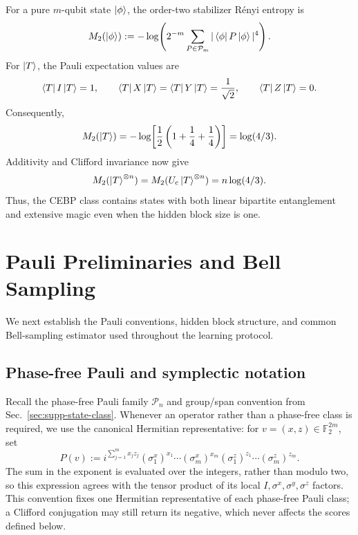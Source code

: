 \documentclass[
  aps,
  prx,
  reprint,
  superscriptaddress,
  amsmath,
  amssymb,
  nofootinbib,
  longbibliography
]{revtex4-2}
\newcommand{\Pc}{\mathcal{P}}
\newcommand{\Fc}{\mathbb{F}_2}
\begin{document}
For a pure $m$-qubit state $\ket{\phi}$, the order-two stabilizer R\'enyi
entropy is~\cite{LeoneOlivieroHamma2022SRE}
\begin{equation}
M_2(\ket{\phi})
:=-\log\!\left(
2^{-m}\sum_{P\in\Pc_m}|\bra{\phi}P\ket{\phi}|^4
\right).
\label{eq:supp-stabilizer-renyi-two}
\end{equation}
For $\ket{T}$, the Pauli expectation values are
\begin{equation}
\bra{T}I\ket{T}=1,
\qquad
\bra{T}X\ket{T}=\bra{T}Y\ket{T}=\frac{1}{\sqrt2},
\qquad
\bra{T}Z\ket{T}=0.
\end{equation}
Consequently,
\begin{equation}
M_2(\ket{T})
=-\log\!\left[\frac{1}{2}\left(1+\frac14+\frac14\right)\right]
=\log(4/3).
\end{equation}
Additivity and Clifford invariance now give
\begin{equation}
M_2(\ket{T}^{\otimes n})
=M_2(U_{\mathrm c}\ket{T}^{\otimes n})
=n\log(4/3).
\end{equation}
Thus, the CEBP class contains states with both linear bipartite entanglement
and extensive magic even when the hidden block size is one.

\section{Pauli Preliminaries and Bell Sampling}
\label{sec:supp-notation}

We next establish the Pauli conventions, hidden block structure, and common
Bell-sampling estimator used throughout the learning protocol.

\subsection{Phase-free Pauli and symplectic notation}
\label{sec:supp-pauli-notation}

Recall the phase-free Pauli family $\Pc_n$ and group/span convention from
Sec.~\ref{sec:supp-state-class}.  Whenever an operator rather than a
phase-free class is required, we use the canonical Hermitian representative:
for $v=(x,z)\in\Fc^{2m}$, set
\begin{equation}
P(v)
:=
i^{\sum_{j=1}^m x_jz_j}
(\sigma_1^x)^{x_1}\cdots(\sigma_m^x)^{x_m}
(\sigma_1^z)^{z_1}\cdots(\sigma_m^z)^{z_m}.
\end{equation}
The sum in the exponent is evaluated over the integers, rather than modulo
two, so this expression agrees with the tensor product of its local
$I,\sigma^x,\sigma^y,\sigma^z$ factors.  This convention fixes one Hermitian
representative of each phase-free Pauli class; a Clifford conjugation may
still return its negative, which never affects the scores defined below.
\end{document}
